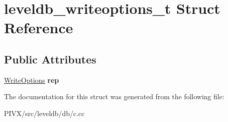 \hypertarget{structleveldb__writeoptions__t}{}\section{leveldb\+\_\+writeoptions\+\_\+t Struct Reference}
\label{structleveldb__writeoptions__t}
\subsection*{Public Attributes}
\begin{DoxyCompactItemize}
\item 
\mbox{\label{structleveldb__writeoptions__t_ad51ccdc92007bd69dcb075bba4aef788}} 
\mbox{\hyperlink{structleveldb_1_1_write_options}{Write\+Options}} {\bfseries rep}
\end{DoxyCompactItemize}


The documentation for this struct was generated from the following file\+:\begin{DoxyCompactItemize}
\item 
P\+I\+V\+X/src/leveldb/db/c.\+cc\end{DoxyCompactItemize}
